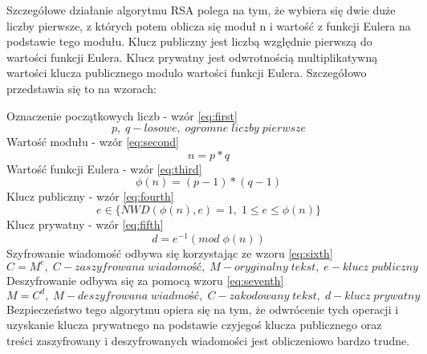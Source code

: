 \vspace{0.3\baselineskip}

Szczegółowe działanie algorytmu RSA polega na tym, że wybiera się dwie duże liczby pierwsze, z których potem oblicza się moduł n i wartość z funkcji Eulera na podstawie tego modułu. Klucz publiczny jest liczbą względnie pierwszą do wartości funkcji Eulera. Klucz prywatny jest odwrotnością multiplikatywną wartości klucza publicznego modulo wartości funkcji Eulera. Szczegółowo przedstawia się to na wzorach:

Oznaczenie początkowych liczb - wzór \ref{eq:first}
\begin{equation}
    p, \; q-losowe, \; ogromne \; liczby \; pierwsze
    \label{eq:first}
\end{equation}
Wartość modułu - wzór \ref{eq:second}
\begin{equation}
    n=p*q
    \label{eq:second}
\end{equation}
Wartość funkcji Eulera - wzór \ref{eq:third}
\begin{equation}
    \phi(n)=(p-1)*(q-1)
    \label{eq:third}
\end{equation}
Klucz publiczny - wzór \ref{eq:fourth}
\begin{equation}
    e \in \{NWD(\phi(n),e)=1, \; 1 \leqslant e \leqslant \phi(n)\}
    \label{eq:fourth}
\end{equation}
Klucz prywatny - wzór \ref{eq:fifth}
\begin{equation}
    d= e^{-1} (mod \; \phi(n))
    \label{eq:fifth}
\end{equation}
Szyfrowanie wiadomość odbywa się korzystając ze wzoru \ref{eq:sixth}
\begin{equation}
    C= M^e, \; C-zaszyfrowana \;  wiadomość, \; M-oryginalny \; tekst, \; e-klucz \; publiczny
    \label{eq:sixth}
\end{equation}
Deszyfrowanie odbywa się za pomocą wzoru \ref{eq:seventh}
\begin{equation}
    M= C^d, \; M-deszyfrowana \; wiadmość, \;C-zakodowany \; tekst, \; d-klucz \; prywatny
    \label{eq:seventh}
\end{equation}
Bezpieczeństwo tego algorytmu opiera się na tym, że odwrócenie tych operacji i uzyskanie klucza prywatnego na podstawie czyjegoś klucza publicznego oraz treści zaszyfrowany i deszyfrowanych wiadomości jest obliczeniowo bardzo trudne.

